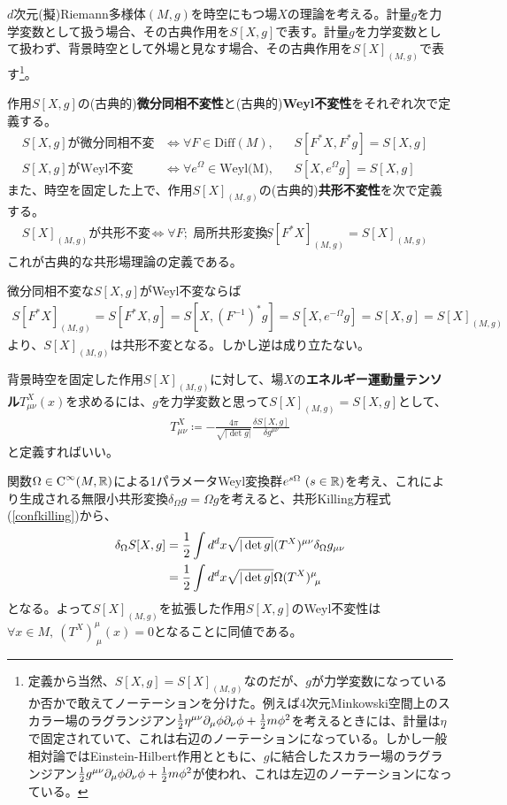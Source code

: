 $d$次元(擬)Riemann多様体$(M,g)$を時空にもつ場$X$の理論を考える。計量$g$を力学変数として扱う場合、その古典作用を$S[X,g]$で表す。計量$g$を力学変数として扱わず、背景時空として外場と見なす場合、その古典作用を$S[X]_{(M,g)}$で表す\footnote{定義から当然、$S[X,g]=S[X]_{(M,g)}$なのだが、$g$が力学変数になっているか否かで敢えてノーテーションを分けた。例えば4次元Minkowski空間上のスカラー場のラグランジアン$\frac{1}{2}\eta^{\mu\nu}\partial_\mu \phi \partial_\nu \phi+\frac{1}{2}m\phi^2$を考えるときには、計量は$\eta$で固定されていて、これは右辺のノーテーションになっている。しかし一般相対論ではEinstein-Hilbert作用とともに、$g$に結合したスカラー場のラグランジアン$\frac{1}{2}g^{\mu\nu}\partial_\mu \phi \partial_\nu \phi+\frac{1}{2}m\phi^2$が使われ、これは左辺のノーテーションになっている。}。
\begin{oframed}
作用$S[X,g]$の(古典的)\textbf{微分同相不変性}と(古典的)\textbf{Weyl不変性}をそれぞれ次で定義する。
\begin{align}
&S[X,g]\text{が微分同相不変}&&\iff \forall F\in\text{Diff}(M),&& S[F^\ast X,F^\ast g]=S[X,g]&&\\
&S[X,g]\text{がWeyl不変}&&\iff \forall e^\Omega \in\text{Weyl(M)},&& S[X,e^\Omega g]=S[X,g]&&
\end{align}
また、時空を固定した上で、作用$S[X]_{(M,g)}$の(古典的)\textbf{共形不変性}を次で定義する。
\begin{align}
&S[X]_{(M,g)}\text{が共形不変}&&\iff \forall F;\text{ 局所共形変換},&& S[F^\ast X]_{(M,g)}=S[X]_{(M,g)}&&
\end{align}
これが古典的な共形場理論の定義である。
\end{oframed}

微分同相不変な$S[X,g]$がWeyl不変ならば
\begin{align}
S[F^\ast X]_{(M,g)}=S[F^\ast X,g]=S[X,(F^{-1})^\ast g]=S[X,e^{-\Omega}g]=S[X,g]=S[X]_{(M,g)}
\end{align}
より、$S[X]_{(M,g)}$は共形不変となる。しかし逆は成り立たない。

背景時空を固定した作用$S[X]_{(M,g)}$に対して、場$X$の\textbf{エネルギー運動量テンソル}$T^X_{\mu\nu}(x)$を求めるには、$g$を力学変数と思って$S[X]_{(M,g)}=S[X,g]$として、
\begin{align}\label{defEMtensor}
T^X_{\mu\nu}\coloneqq -\frac{4\pi}{\sqrt{|\det g|}}\frac{\delta S[X,g]}{\delta g^{\mu\nu}}
\end{align}
と定義すればいい。

関数$\Omega\in\text{C}^\infty(M,\mathbb{R})$による1パラメータWeyl変換群$e^{s\Omega}\ (s\in\R)$を考え、これにより生成される無限小共形変換$\delta_\Omega g= \Omega g$を考えると、共形Killing方程式(\ref{confkilling})から、
\begin{align}
\delta_\Omega S[X,g]&=\frac{1}{2}\int d^d x \sqrt{|\det g|}(T^X)^{\mu\nu}\delta_\Omega g_{\mu\nu}\notag\\
&=\frac{1}{2}\int d^d x \sqrt{|\det g|}\Omega (T^X)^{\mu}_{\ \mu}
\end{align}
となる。よって$S[X]_{(M,g)}$を拡張した作用$S[X,g]$のWeyl不変性は$\forall x\in M,\ (T^X)^{\mu}_{\ \mu}(x)=0$となることに同値である。

